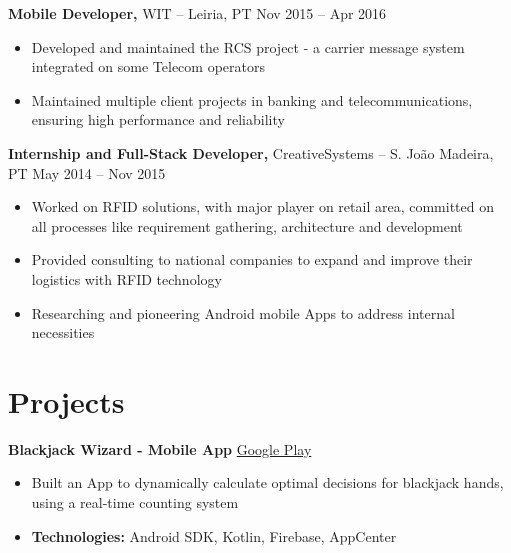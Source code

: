 \documentclass[11pt]{article}       %
\begin{document}
\textbf{Mobile Developer,} {WIT} -- Leiria, PT \hfill Nov 2015 -- Apr 2016 \\
\vspace{-9pt}
\begin{itemize}
  \item Developed and maintained the RCS project - a carrier message system integrated on some Telecom operators
  \item Maintained multiple client projects in banking and telecommunications, ensuring high performance and reliability
\end{itemize}

\textbf{Internship and Full-Stack Developer,} {CreativeSystems} -- S. João Madeira, PT \hfill May 2014 -- Nov 2015 \\
\vspace{-9pt}
\begin{itemize}
  \item Worked on RFID solutions, with major player on retail area, committed on all processes like requirement gathering, architecture and development
  \item Provided consulting to national companies to expand and improve their logistics with RFID technology
  \item Researching and pioneering Android mobile Apps to address internal necessities
\end{itemize}


\vspace{-18.5pt}

\section*{Projects}
\textbf{Blackjack Wizard - Mobile App} \hfill \href{https://play.google.com/store/apps/details?id=pt.psilva.blackjackwizard.demo&pcampaignid=web_share}{Google Play} \\
\vspace{-9pt}
\begin{itemize}
  \item Built an App to dynamically calculate optimal decisions for blackjack hands, using a real-time counting system
  \item \textbf{Technologies:} Android SDK, Kotlin, Firebase, AppCenter
\end{itemize}
\end{document}

